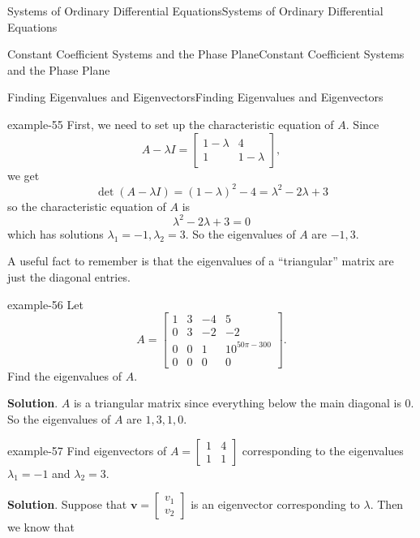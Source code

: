 \documentclass[10pt,]{book}
\numberwithin{equation}{section}
\renewcommand{\vec}[1]{\mathbf{#1}}
\newcommand{\amp}{&}
\begin{document}
\begin{chapterptx}{Systems of Ordinary Differential Equations}{}{Systems of Ordinary Differential Equations}{}{}
\begin{sectionptx}{Constant Coefficient Systems and the Phase Plane}{}{Constant Coefficient Systems and the Phase Plane}{}{}
\begin{subsectionptx}{Finding Eigenvalues and Eigenvectors}{}{Finding Eigenvalues and Eigenvectors}{}{}
\begin{example}{}{example-55}
\hypertarget{p-335}{}%
First, we need to set up the characteristic equation of \(A\). Since%
\begin{equation*}
A-\lambda I = \begin{bmatrix}1-\lambda \amp  4 \\ 1 \amp  1-\lambda\end{bmatrix},
\end{equation*}
we get%
\begin{equation*}
\det(A-\lambda I) = (1-\lambda)^{2} - 4 = \lambda^{2}-2\lambda+3
\end{equation*}
so the characteristic equation of \(A\) is%
\begin{equation*}
\lambda^{2}-2\lambda+3 = 0
\end{equation*}
which has solutions \(\lambda_{1} = -1,\lambda_{2} = 3\). So the eigenvalues of \(A\) are \(-1,3\).%
\end{example}
\hypertarget{p-336}{}%
A useful fact to remember is that the eigenvalues of a ``triangular'' matrix are just the diagonal entries.%
\begin{example}{}{example-56}%
\hypertarget{p-337}{}%
Let%
\begin{equation*}
A = \begin{bmatrix}1 \amp  3 \amp  -4 \amp  5 \\ 0 \amp  3 \amp  -2 \amp  -2 \\ 0 \amp  0 \amp  1 \amp  10^{50\pi-300} \\ 0 \amp  0 \amp  0 \amp  0\end{bmatrix}.
\end{equation*}
Find the eigenvalues of \(A\).%
\par\smallskip%
\noindent\textbf{Solution}.\hypertarget{solution-53}{}\quad%
\hypertarget{p-338}{}%
\(A\) is a triangular matrix since everything below the main diagonal is \(0\). So the eigenvalues of \(A\) are \(1,3,1,0\).%
\end{example}
\begin{example}{}{example-57}%
\hypertarget{p-339}{}%
Find eigenvectors of \(A = \begin{bmatrix}1 \amp  4 \\ 1 \amp  1\end{bmatrix}\) corresponding to the eigenvalues \(\lambda_{1} = -1\) and \(\lambda_{2} = 3\).%
\par\smallskip%
\noindent\textbf{Solution}.\hypertarget{solution-54}{}\quad%
\hypertarget{p-340}{}%
Suppose that \(\vec{v} = \begin{bmatrix} v_{1} \\ v_{2} \end{bmatrix}\) is an eigenvector corresponding to \(\lambda\). Then we know that%

\end{example}
\end{subsectionptx}
\end{sectionptx}
\end{chapterptx}
\end{document}
